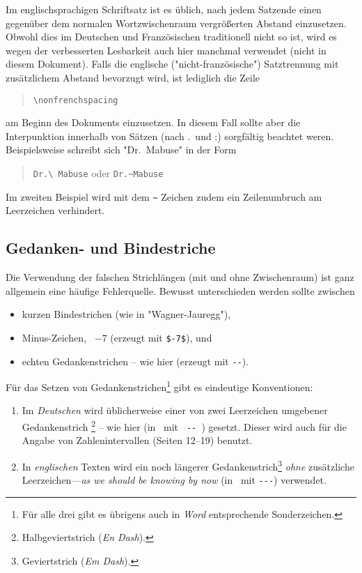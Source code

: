 Im englischsprachigen Schriftsatz ist es üblich, nach jedem
Satzende einen gegenüber dem normalen Wortzwischenraum
vergrößerten Abstand einzusetzen. Obwohl dies im Deutschen und
Französischen traditionell nicht so ist, wird es wegen der
verbesserten Lesbarkeit auch hier manchmal verwendet (nicht in diesem
Dokument). Falls die englische ("nicht-französische") Satztrennung mit
zusätzlichem Abstand bevorzugt wird, ist lediglich die Zeile
%
\begin{quote}
\verb!\nonfrenchspacing!
\end{quote}
%
am Beginn des Dokuments einzusetzen. 
In diesem Fall sollte 
aber die Interpunktion innerhalb von
Sätzen (nach .\ und :) sorgfältig beachtet weren. Beispielsweise
schreibt sich "Dr.\ Mabuse" in der Form
%
\begin{quote}
\verb!Dr.\ Mabuse! oder \verb!Dr.~Mabuse!
\end{quote}
%
Im zweiten Beispiel wird mit dem \verb!~! Zeichen zudem ein Zeilenumbruch am Leerzeichen verhindert.


\subsection{Gedanken- und Bindestriche}
\label{sec:gedankenstrich}

Die Verwendung der falschen Strichlängen (mit und ohne
Zwischenraum) ist ganz allgemein eine häufige Fehlerquelle.
Bewusst unterschieden werden sollte zwischen
%
\begin{itemize}
\item kurzen Bindestrichen (wie in "Wagner-Jauregg"), %
\item Minus-Zeichen, \zB\ $-7$ (erzeugt mit \verb!$-7$!), und %
\item echten Gedankenstrichen -- wie hier (erzeugt mit \verb!--!).
\end{itemize}
%
\noindent Für das Setzen von Gedankenstrichen\footnote{Für alle
drei gibt es übrigens auch in \emph{Word} entsprechende
Sonderzeichen.} gibt es eindeutige Konventionen:
%
\begin{enumerate}
\item Im \emph{Deutschen} wird üblicherweise einer von zwei
Leerzeichen umgebener Gedankenstrich%
\footnote{Halbgeviertstrich (\emph{En Dash}).} -- wie hier (in
\latex\ mit {\verb*! -- !}) gesetzt. Dieser wird auch für die Angabe von
Zahlenintervallen (Seiten 12--19) benutzt. 
%
\item In \emph{englischen} Texten wird ein noch längerer
Gedankenstrich\footnote{Geviertstrich (\emph{Em Dash}).} \emph{ohne}
zusätzliche Leerzeichen---\emph{as we should be knowing by now}
(in \latex\ mit {\verb*!---!}) verwendet.
%
\end{enumerate}




